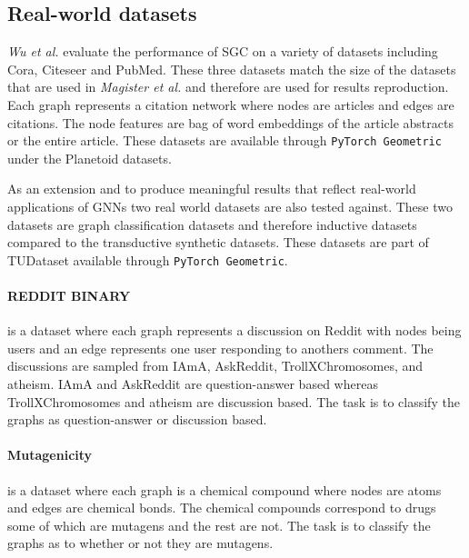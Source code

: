 \subsection{Real-world datasets}
\label{sec:RWD}


\textit{Wu et al.}\cite{wu2019simplifying} evaluate the performance of SGC on a variety of datasets including Cora, Citeseer and PubMed\cite{citation}.
These three datasets match the size of the datasets that are used in \textit{Magister et al.} and therefore are used for results reproduction.
Each graph represents a citation network where nodes are articles and edges are citations.
The node features are bag of word embeddings of the article abstracts or the entire article.
These datasets are available through \texttt{PyTorch Geometric}\cite{Fey/Lenssen/2019} under the Planetoid\cite{planetoid} datasets.

As an extension and to produce meaningful results that reflect real-world applications of GNNs two real world datasets are also tested against.
These two datasets are graph classification datasets and therefore inductive datasets compared to the transductive synthetic datasets.
These datasets are part of TUDataset \cite{Morris+2020} available through \texttt{PyTorch Geometric}\cite{Fey/Lenssen/2019}.

\paragraph{REDDIT BINARY}
is a dataset where each graph represents a discussion on Reddit with nodes being users and an edge represents one user responding to anothers comment.
The discussions are sampled from IAmA, AskReddit, TrollXChromosomes, and atheism.
IAmA and AskReddit are question-answer based whereas TrollXChromosomes and atheism are discussion based.
The task is to classify the graphs as question-answer or discussion based.

\paragraph{Mutagenicity}
is a dataset where each graph is a chemical compound where nodes are atoms and edges are chemical bonds.
The chemical compounds correspond to drugs some of which are mutagens and the rest are not.
The task is to classify the graphs as to whether or not they are mutagens.

